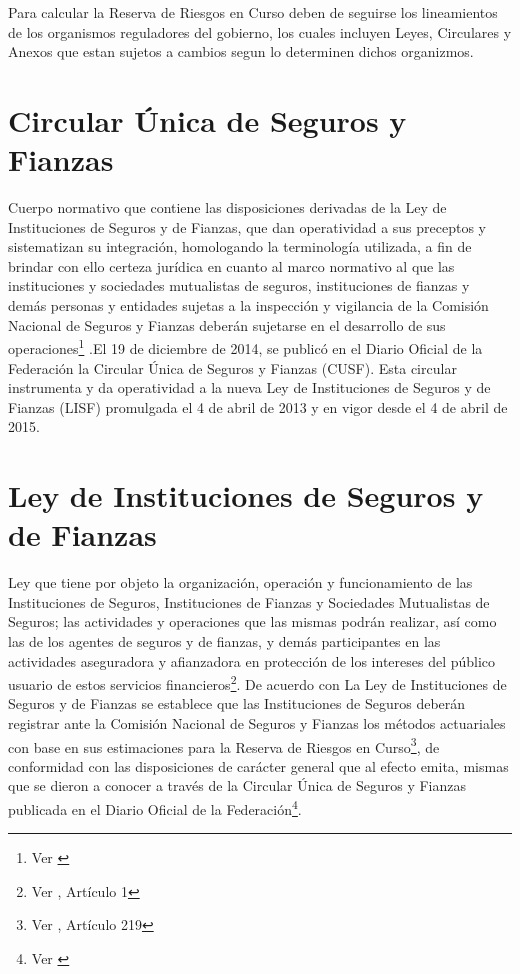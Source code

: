 \documentclass[11pt,twoside,openright,spanish]{report}
\numberwithin{equation}{chapter}
\numberwithin{figure}{chapter}
\numberwithin{table}{chapter}
\begin{document}
	Para calcular la Reserva de Riesgos en Curso deben de seguirse los lineamientos de los organismos reguladores del gobierno, los cuales incluyen Leyes, Circulares y Anexos que estan sujetos a cambios segun lo determinen dichos organizmos.
	
	\section{Circular Única de Seguros y Fianzas}

	
	Cuerpo normativo que contiene las disposiciones derivadas de la Ley de Instituciones de Seguros y de Fianzas, que dan operatividad a sus preceptos y sistematizan su integración, homologando la terminología utilizada, a fin de brindar con ello certeza jurídica en cuanto al marco normativo al que las instituciones y sociedades mutualistas de seguros, instituciones de fianzas y demás personas y entidades sujetas a la inspección y vigilancia de la Comisión Nacional de Seguros y Fianzas deberán sujetarse en el desarrollo de sus operaciones\footnote{Ver \citet{IDefCusf}} .El 19 de diciembre de 2014, se publicó en el Diario Oficial de la Federación la Circular Única de Seguros y Fianzas (CUSF). Esta circular instrumenta y da operatividad a la nueva Ley de Instituciones de Seguros y de Fianzas (LISF) promulgada el 4 de abril de 2013 y en vigor desde el 4 de abril de 2015. 
	
	\section{Ley de Instituciones de Seguros y de Fianzas}

	Ley que tiene por objeto la organización, operación y funcionamiento de las Instituciones de Seguros, Instituciones de Fianzas y Sociedades Mutualistas de Seguros; las actividades y operaciones que las mismas podrán realizar, así como las de los agentes de seguros y de fianzas, y demás participantes en las actividades aseguradora y afianzadora en protección de los intereses del público usuario de estos servicios financieros\footnote{Ver \citet{GLisf}, Artículo 1}. De acuerdo con La Ley de Instituciones de Seguros y de Fianzas se establece que las Instituciones de Seguros deberán registrar ante la Comisión Nacional de Seguros y Fianzas los métodos actuariales con base en sus estimaciones para la Reserva de Riesgos en Curso\footnote{Ver \citet{FAmis}, Artículo 219}, de conformidad con las disposiciones de carácter general que al efecto emita, mismas que se dieron a conocer a través de la Circular Única de Seguros y Fianzas publicada en el Diario Oficial de la Federación\footnote{Ver \citet{HCusf}}.
	 
\end{document}
